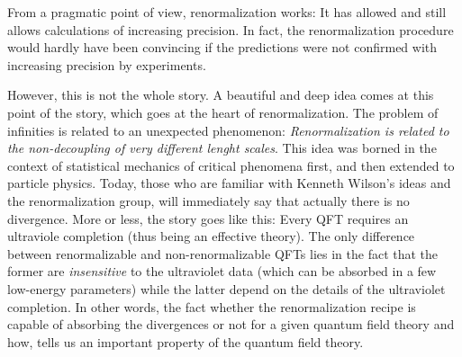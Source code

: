 From a pragmatic point of view, 
renormalization works: It 
has allowed and still allows calculations of increasing precision.
In fact, the renormalization procedure would hardly have been convincing if the
predictions were not confirmed with increasing precision by experiments.

However, this is not the whole story. 
A beautiful and deep idea comes at this point of the story, which goes at the
heart of renormalization. 
   The problem of infinities is related to an unexpected phenomenon:
   \emph{Renormalization is related to the non-decoupling of very different
      lenght scales}.
   This idea was borned in the context of statistical mechanics of critical
   phenomena first, and then
   extended to particle physics. 
Today, those who are familiar with Kenneth Wilson's ideas and the renormalization
group, will immediately say that actually there is no divergence.
More or less, the story goes like this: 
Every QFT requires an ultraviole completion (thus being an effective theory).
The only difference between renormalizable and non-renormalizable QFTs lies in
the fact that the former are \emph{insensitive} to the ultraviolet data (which
can be absorbed in a few low-energy parameters) while the latter depend on the
details of the ultraviolet completion.
In other words, the fact whether the renormalization recipe is capable of absorbing the
divergences or not for a given quantum field theory and how, 
tells us an important property of the quantum field theory. 



 
